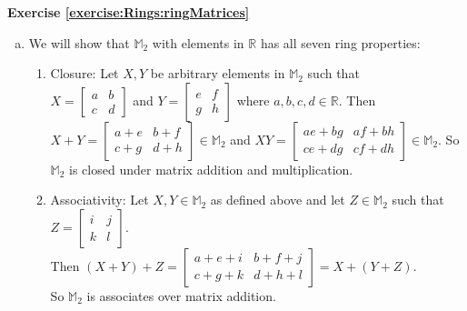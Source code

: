 \noindent\textbf{Exercise \ref{exercise:Rings:ringMatrices}}
\begin{enumerate}[(a)]
\item We will show that ${\mathbb M}_2$ with elements in ${\mathbb R}$ has all seven ring properties:
\begin{enumerate}[(1)]
    \item Closure:  Let $X,Y$ be arbitrary elements in ${\mathbb M}_2$ such that\\
    $X=
\begin{bmatrix}
a & b\\
c & d
\end{bmatrix}$
and $Y=
\begin{bmatrix}
e & f\\
g & h
\end{bmatrix}$
where $a,b,c,d\in{\mathbb R}$.  Then\\
$X+Y=
\begin{bmatrix}
a+e & b+f\\
c+g & d+h
\end{bmatrix}
\in{\mathbb M}_2$ and $XY=
\begin{bmatrix}
ae+bg & af+bh\\
ce+dg & cf+dh
\end{bmatrix}
\in{\mathbb M}_2$.  So ${\mathbb M}_2$ is closed under matrix addition and multiplication.
\item Associativity:  Let $X,Y\in{\mathbb M}_2$ as defined above and let $Z\in{\mathbb M}_2$ such that $Z=
\begin{bmatrix}
i & j\\
k & l
\end{bmatrix}$.\\  
Then $(X+Y)+Z=
\begin{bmatrix}
a+e+i & b+f+j\\
c+g+k & d+h+l
\end{bmatrix}
=X+(Y+Z)$.\\  
So ${\mathbb M}_2$ is associates over matrix addition.\\


\end{enumerate}
\end{enumerate}
